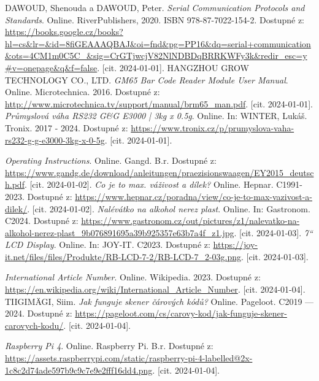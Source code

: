 \begin{thebibliography}{19}
DAWOUD, Shenouda a DAWOUD, Peter. \textit{Serial Communication Protocols and Standards}. Online. RiverPublishers, 2020. ISBN 978-87-7022-154-2. Dostupné z: \url{https://books.google.cz/books?hl=cs&lr=&id=8fiGEAAAQBAJ&oi=fnd&pg=PP16&dq=serial+communication&ots=4CM1m0C5C\_&sig=CrGTjwcjV82NlNDBDqBRRKWFy3k&redir\_esc=y\#v=onepage&q&f=false}. [cit. 2024-01-01].
HANGZHOU GROW TECHNOLOGY CO., LTD. \textit{GM65 Bar Code Reader Module User Manual}. Online. Microtechnica. 2016. Dostupné z: \url{http://www.microtechnica.tv/support/manual/brm65\_man.pdf}. [cit. 2024-01-01].
\textit{Průmyslová váha RS232 G\&G E3000 | 3kg x 0.5g}. Online. In: WINTER, Lukáš. Tronix. 2017 - 2024. Dostupné z: \url{https://www.tronix.cz/p/prumyslova-vaha-rs232-g-g-e3000-3kg-x-0-5g}. [cit. 2024-01-01].

\textit{Operating Instructions}. Online. Gangd. B.r. Dostupné z: \url{https://www.gandg.de/download/anleitungen/praezisionswaagen/EY2015\_deutsch.pdf}. [cit. 2024-01-02].
\textit{Co je to max. váživost a dílek?} Online. Hepnar. C1991-2023. Dostupné z: \url{https://www.hepnar.cz/poradna/view/co-je-to-max-vazivost-a-dilek/}. [cit. 2024-01-02].
\textit{Nalévátko na alkohol nerez plast}. Online. In: Gastronom. C2024. Dostupné z: \url{https://www.gastronom.cz/out/pictures/z1/nalevatko-na-alkohol-nerez-plast\_9b076891695a39b925357e63b7a4f\_z1.jpg}. [cit. 2024-01-03].
\textit{7`` LCD Display}. Online. In: JOY-IT. C2023. Dostupné z: \url{https://joy-it.net/files/files/Produkte/RB-LCD-7-2/RB-LCD-7\_2-03g.png}. [cit. 2024-01-03].

\textit{International Article Number}. Online. Wikipedia. 2023. Dostupné z: \url{https://en.wikipedia.org/wiki/International\_Article\_Number}. [cit. 2024-01-04].
TIIGIMÄGI, Siim. \textit{Jak funguje skener čárových kódů?} Online. Pageloot. C2019 --- 2024. Dostupné z: \url{https://pageloot.com/cs/carovy-kod/jak-funguje-skener-carovych-kodu/}. [cit. 2024-01-04].


\textit{Raspberry Pi 4}. Online. Raspberry Pi. B.r. Dostupné z: \url{https://assets.raspberrypi.com/static/raspberry-pi-4-labelled@2x-1c8c2d74ade597b9c9c7e9e2fff16dd4.png}. [cit. 2024-01-04].

\end{thebibliography}